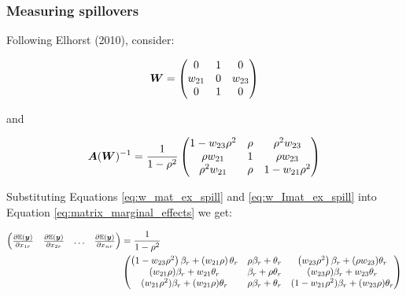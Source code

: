 \documentclass[english,10pt]{beamer}\usepackage[]{graphicx}\usepackage[]{xcolor}
\begin{document}
\begin{frame}
\frametitle{Measuring spillovers}

Following Elhorst (2010), consider:

\begin{equation}\label{eq:w_mat_ex_spill}
  \bm W = \begin{pmatrix}
          0      & 1 & 0 \\
          w_{21} & 0 & w_{23} \\
          0      & 1 & 0
        \end{pmatrix}
\end{equation}

and


\begin{equation}\label{eq:w_Imat_ex_spill}
  \bm A(\bm W)^{-1} = \frac{1}{1 - \rho^2}
  \begin{pmatrix}
          1 - w_{23}\rho^2     & \rho & \rho^2 w_{23}\\
          \rho w_{21} & 1 & \rho w_{23} \\
          \rho^2 w_{21}      & \rho & 1 - w_{21}\rho^2 
        \end{pmatrix}
\end{equation}


Substituting Equations \ref{eq:w_mat_ex_spill} and \ref{eq:w_Imat_ex_spill} into Equation \ref{eq:matrix_marginal_effects} we get:

\tiny
\begin{equation*}
\begin{split}
  \begin{pmatrix}
  \frac{\partial \mathbb{E}(\bm y)}{\partial x_{1r}} & \frac{\partial \mathbb{E}(\bm y)}{\partial x_{2r}} & \hdots & \frac{\partial \mathbb{E}(\bm y)}{\partial x_{nr}} 
   \end{pmatrix} & = \frac{1}{1 - \rho^2} \\
   & \begin{pmatrix}
    \left(1 -  w_{23}\rho^2\right)\beta_r + \left(w_{21}\rho\right) \theta_r & \rho \beta_r + \theta_r & \left(w_{23}\rho^2\right)\beta_r + (\rho w_{23})\theta_r \\
    (w_{21}\rho)\beta_r + w_{21}\theta_r & \beta_r + \rho \theta_r & (w_{23}\rho)\beta_r + w_{23}\theta_r \\
    (w_{21}\rho^2)\beta_r + (w_{21}\rho)\theta_r & \rho \beta_r + \theta_r & (1 -  w_{21}\rho^2)\beta_r + (w_{23}\rho)\theta_r
   \end{pmatrix}
   \end{split}
\end{equation*}
\end{frame}
\end{document}
